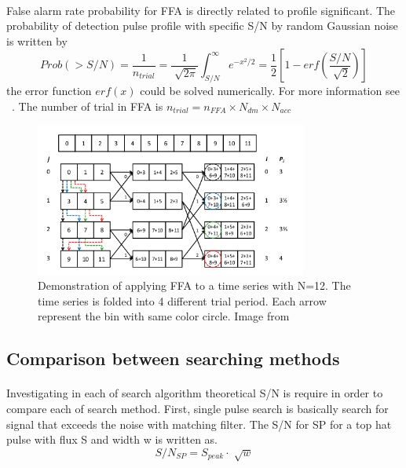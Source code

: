 \documentclass[thesis_msc.tex]{subfiles}
\begin{document}
         \paragraph{} False alarm rate probability for FFA is directly related to profile significant. The probability of detection pulse profile with specific S/N by random Gaussian noise is written by 
                 \begin{equation}
        Prob(>S/N)=\frac{1}{n_{trial}}=\frac{1}{\sqrt[]{2\pi}} \int^{\infty}_{S/N} e^{-x^2/2}=\frac{1}{2} [1-erf(\frac{S/N}{\sqrt[]{2}})]
        \end{equation}
        the error function $erf(x)$ could be solved numerically. For more information see ~\cite{press1992numerical}. The number of trial in FFA is $n_{trial}=n_{FFA} \times N_{dm} \times N_{acc} $
         \begin{figure}[h]
\centering
\includegraphics[width=0.80\textwidth]{figures/FFA.png}
\caption{Demonstration of applying FFA to a time series with N=12. The time series is folded into 4 different trial period. Each arrow represent the bin with same color circle. Image from  ~\citep{Andrew}}
\label{FFA_im}
\end{figure}
        \subsection{Comparison between searching methods} \label{Com}
        \paragraph{} Investigating in each of search algorithm theoretical S/N is require in order to compare each of search method. First, single pulse search is basically search for signal that exceeds the noise with matching filter. The S/N for SP for a top hat pulse with flux S and width w is written as.   
		\begin{equation}
		S/N_{SP}=S_{peak} \cdot \sqrt[]{w} \label{snr_sp}
		\end{equation}       
\end{document}
